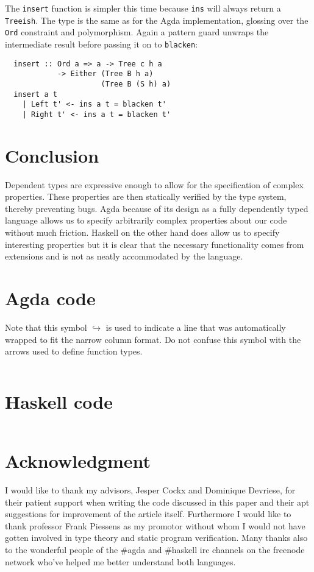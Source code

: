 \documentclass[journal, retainorgcmds]{IEEEtran}
\newcommand{\ihask}[1]{\texttt{#1}}
\begin{document}
The \ihask{insert} function is simpler this time because \ihask{ins} will
always return a \ihask{Treeish}.
The type is the same as for the Agda implementation, glossing over the
\ihask{Ord} constraint and polymorphism.
Again a pattern guard unwraps the intermediate result before passing it on to
\ihask{blacken}:

\begin{verbatim}
  insert :: Ord a => a -> Tree c h a
            -> Either (Tree B h a)
                      (Tree B (S h) a)
  insert a t
    | Left t' <- ins a t = blacken t'
    | Right t' <- ins a t = blacken t'
\end{verbatim}


\section{Conclusion}
Dependent types are expressive enough to allow for the specification of complex
properties.
These properties are then statically verified by the type system, thereby
preventing bugs.
Agda because of its design as a fully dependently typed language allows us to
specify arbitrarily complex properties about our code without much friction.
Haskell on the other hand does allow us to specify interesting properties but
it is clear that the necessary functionality comes from extensions and is not
as neatly accommodated by the language.

\appendices
\section{Agda code \label{app:agda}}
Note that this symbol {\tiny\ensuremath{\hookrightarrow}} is
used to indicate a line that was automatically wrapped to fit the narrow
column format. Do not confuse this symbol with the arrows used to define
function types.
\inputminted[fontsize=\small,breaklines]{agda}{../RedBlackTree.agda}
 

\section{Haskell code \label{app:haskell}}
\inputminted[fontsize=\small,breaklines]{haskell}{../RedBlackTree.hs}

\section*{Acknowledgment}
I would like to thank my advisors, Jesper Cockx and Dominique Devriese, for
their patient support when writing the code discussed in this paper and their
apt suggestions for improvement of the article itself.
Furthermore I would like to thank professor Frank Piessens as my promotor
without whom I would not have gotten involved in type theory and static
program verification.
Many thanks also to the wonderful people of the \#agda and \#haskell irc
channels on the freenode network who've helped me better understand both
languages.



\end{document}
